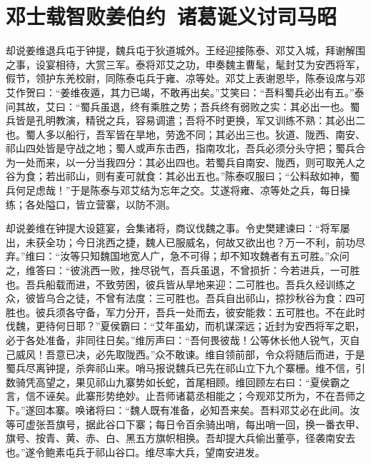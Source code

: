 \chapter{邓士载智败姜伯约~诸葛诞义讨司马昭}

却说姜维退兵屯于钟提，魏兵屯于狄道城外。王经迎接陈泰、邓艾入城，拜谢解围之事，设宴相待，大赏三军。泰将邓艾之功，申奏魏主曹髦，髦封艾为安西将军，假节，领护东羌校尉，同陈泰屯兵于雍、凉等处。邓艾上表谢恩毕，陈泰设席与邓艾作贺曰：“姜维夜遁，其力已竭，不敢再出矣。”艾笑曰：“吾料蜀兵必出有五。”泰问其故，艾曰：“蜀兵虽退，终有乘胜之势；吾兵终有弱败之实：其必出一也。蜀兵皆是孔明教演，精锐之兵，容易调遣；吾将不时更换，军又训练不熟：其必出二也。蜀人多以船行，吾军皆在旱地，劳逸不同；其必出三也。狄道、陇西、南安、祁山四处皆是守战之地；蜀人或声东击西，指南攻北，吾兵必须分头守把；蜀兵合为一处而来，以一分当我四分：其必出四也。若蜀兵自南安、陇西，则可取羌人之谷为食；若出祁山，则有麦可就食：其必出五也。”陈泰叹服曰；“公料敌如神，蜀兵何足虑哉！”于是陈泰与邓艾结为忘年之交。艾遂将雍、凉等处之兵，每日操练；各处隘口，皆立营寨，以防不测。

却说姜维在钟提大设筵宴，会集诸将，商议伐魏之事。令史樊建谏曰：“将军屡出，未获全功；今日洮西之捷，魏人已服威名，何故又欲出也？万一不利，前功尽弃。”维曰：“汝等只知魏国地宽人广，急不可得；却不知攻魏者有五可胜。”众问之，维答曰：“彼洮西一败，挫尽锐气，吾兵虽退，不曾损折：今若进兵，一可胜也。吾兵船载而进，不致劳困，彼兵皆从旱地来迎：二可胜也。吾兵久经训练之众，彼皆乌合之徒，不曾有法度：三可胜也。吾兵自出祁山，掠抄秋谷为食：四可胜也。彼兵须各守备，军力分开，吾兵一处而去，彼安能救：五可胜也。不在此时伐魏，更待何日耶？”夏侯霸曰：“艾年虽幼，而机谋深远；近封为安西将军之职，必于各处准备，非同往日矣。”维厉声曰：“吾何畏彼哉！公等休长他人锐气，灭自己威风！吾意已决，必先取陇西。”众不敢谏。维自领前部，令众将随后而进，于是蜀兵尽离钟提，杀奔祁山来。哨马报说魏兵已先在祁山立下九个寨栅。维不信，引数骑凭高望之，果见祁山九寨势如长蛇，首尾相顾。维回顾左右曰：“夏侯霸之言，信不诬矣。此寨形势绝妙。止吾师诸葛丞相能之；今观邓艾所为，不在吾师之下。”遂回本寨。唤诸将曰：“魏人既有准备，必知吾来矣。吾料邓艾必在此间。汝等可虚张吾旗号，据此谷口下寨；每日令百余骑出哨，每出哨一回，换一番衣甲、旗号、按青、黄、赤、白、黑五方旗帜相换。吾却提大兵偷出董亭，径袭南安去也。”遂令鲍素屯兵于祁山谷口。维尽率大兵，望南安进发。

